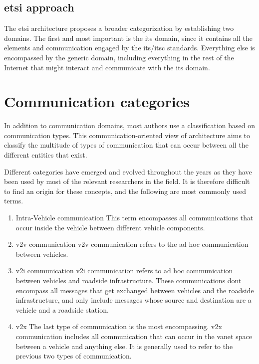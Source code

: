 \subsection[ETSI approach]{\gls{etsi} approach}
The \gls{etsi} architecture proposes a broader categorization by establishing two domains. 
The first and most important is the \gls{its} domain, since it contains all the elements and communication engaged by the \gls{its}/\gls{itsc} standards. 
Everything else is encompassed by the generic domain, including everything in the rest of the Internet that might interact and communicate with the \gls{its} domain.


\section{Communication categories}
\label{sec:VANET_communication_categories}

In addition to communication domains, most authors use a classification based on communication types. This communication-oriented view of architecture aims to classify the multitude of types of communication that can occur between all the different entities that exist.

Different categories have emerged and evolved throughout the years as they have been used by most of the relevant researchers in the field. It is therefore difficult to find an origin for these concepts, and the following are most commonly used terms.

\begin{enumerate}
	\item Intra-Vehicle communication
    This term encompasses all communications that occur inside the vehicle between different vehicle components.
	\item \gls{v2v} communication
    \gls{v2v} communication refers to the ad hoc communication between vehicles.

	\item \gls{v2i} communication
    \gls{v2i} communication refers to ad hoc communication between vehicles and roadside infrastructure. These communications dont encompass all messages that get exchanged between vehicles and the roadside infrastructure, and only include messages whose source and destination are a vehicle and a roadside station.

	\item \gls{v2x}
    The last type of communication is the most encompassing. \gls{v2x} communication includes all communication that can occur in the \gls{vanet} space between a vehicle and anything else. It is generally used to refer to the previous two types of communication.

\end{enumerate}


